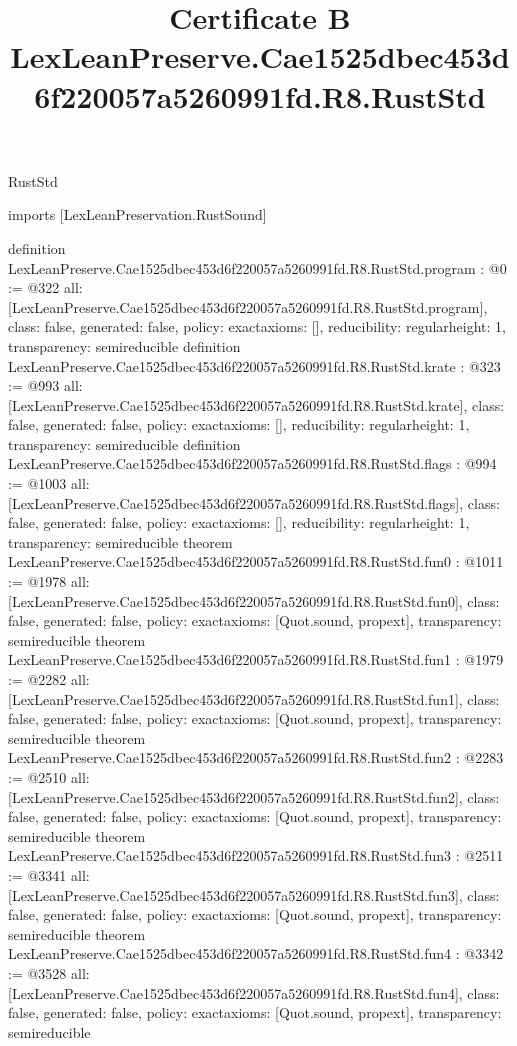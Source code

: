 \begin{lexlean}{RustStd}
\title{Certificate B LexLeanPreserve.Cae1525dbec453d6f220057a5260991fd.R8.RustStd}
\begin{coremodule}
imports [LexLeanPreservation.RustSound]

definition LexLeanPreserve.Cae1525dbec453d6f220057a5260991fd.R8.RustStd.program : @0 := @322 {
  all: [LexLeanPreserve.Cae1525dbec453d6f220057a5260991fd.R8.RustStd.program],
  class: false,
  generated: false,
  policy: exact{axioms: []},
  reducibility: regular{height: 1},
  transparency: semireducible
}
definition LexLeanPreserve.Cae1525dbec453d6f220057a5260991fd.R8.RustStd.krate : @323 := @993 {
  all: [LexLeanPreserve.Cae1525dbec453d6f220057a5260991fd.R8.RustStd.krate],
  class: false,
  generated: false,
  policy: exact{axioms: []},
  reducibility: regular{height: 1},
  transparency: semireducible
}
definition LexLeanPreserve.Cae1525dbec453d6f220057a5260991fd.R8.RustStd.flags : @994 := @1003 {
  all: [LexLeanPreserve.Cae1525dbec453d6f220057a5260991fd.R8.RustStd.flags],
  class: false,
  generated: false,
  policy: exact{axioms: []},
  reducibility: regular{height: 1},
  transparency: semireducible
}
theorem LexLeanPreserve.Cae1525dbec453d6f220057a5260991fd.R8.RustStd.fun0 : @1011 := @1978 {
  all: [LexLeanPreserve.Cae1525dbec453d6f220057a5260991fd.R8.RustStd.fun0],
  class: false,
  generated: false,
  policy: exact{axioms: [Quot.sound, propext]},
  transparency: semireducible
}
theorem LexLeanPreserve.Cae1525dbec453d6f220057a5260991fd.R8.RustStd.fun1 : @1979 := @2282 {
  all: [LexLeanPreserve.Cae1525dbec453d6f220057a5260991fd.R8.RustStd.fun1],
  class: false,
  generated: false,
  policy: exact{axioms: [Quot.sound, propext]},
  transparency: semireducible
}
theorem LexLeanPreserve.Cae1525dbec453d6f220057a5260991fd.R8.RustStd.fun2 : @2283 := @2510 {
  all: [LexLeanPreserve.Cae1525dbec453d6f220057a5260991fd.R8.RustStd.fun2],
  class: false,
  generated: false,
  policy: exact{axioms: [Quot.sound, propext]},
  transparency: semireducible
}
theorem LexLeanPreserve.Cae1525dbec453d6f220057a5260991fd.R8.RustStd.fun3 : @2511 := @3341 {
  all: [LexLeanPreserve.Cae1525dbec453d6f220057a5260991fd.R8.RustStd.fun3],
  class: false,
  generated: false,
  policy: exact{axioms: [Quot.sound, propext]},
  transparency: semireducible
}
theorem LexLeanPreserve.Cae1525dbec453d6f220057a5260991fd.R8.RustStd.fun4 : @3342 := @3528 {
  all: [LexLeanPreserve.Cae1525dbec453d6f220057a5260991fd.R8.RustStd.fun4],
  class: false,
  generated: false,
  policy: exact{axioms: [Quot.sound, propext]},
  transparency: semireducible
}
\end{coremodule}
\end{lexlean}
